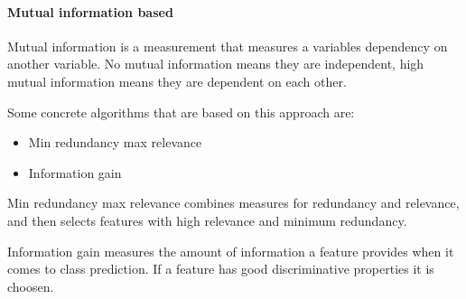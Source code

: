 \paragraph{Mutual information based}
\label{par:methods.flat.filter.mutual_information}

  
Mutual information is a measurement that measures a variables dependency on
another variable. No mutual information means they are independent, high mutual
information means they are dependent on each other.

Some concrete algorithms that are based on this approach are:
\begin{itemize}
  \item Min redundancy max relevance
  \item Information gain
\end{itemize}

Min redundancy max relevance combines measures for redundancy and relevance, and
then selects features with high relevance and minimum redundancy.

Information gain measures the amount of information a feature provides when it
comes to class prediction. If a feature has good discriminative properties it is
choosen.

